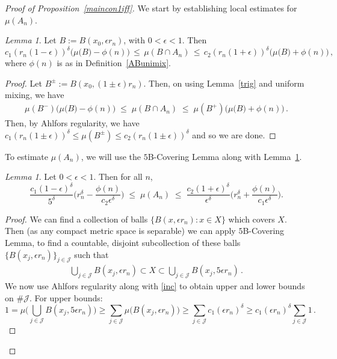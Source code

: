 \documentclass[11pt,reqno]{amsart}
\newcommand{\0}{\mathbf{0}}
\newtheorem{lemma}{Lemma}
\theoremstyle{remark}
\numberwithin{equation}{section}
\newtheorem{lemma}[theorem]{Lemma}
\theoremstyle{remark}
\numberwithin{equation}{section}
\begin{document}
\begin{proof}[Proof of Proposition~\ref{maincon1iff}]
We start by establishing local estimates for $\mu(A_n)$.
\begin{lemma}\label{lban} Let $B:=B(x_0,\epsilon r_n)$, with $0<\epsilon<1$. Then
   $$ c_1(r_n(1 - \epsilon))^\delta \big(\mu(B\big) - \phi(n)\big) \, \leq \, \mu(B \cap A_n) \, \leq \, c_2(r_n(1 + \epsilon))^\delta \big(\mu(B\big) + \phi(n)\big) \, ,
   $$
   where $\phi(n)$ is as in Definition~\ref{ABunimix}.
\end{lemma}
\begin{proof}
 Let $B^{\pm}:=B(x_0, (1\pm\epsilon)r_n)$. Then, on using Lemma~\ref{trig} and uniform mixing, we have \begin{align}
    \mu(B^-) \big(\mu(B\big) - \phi(n)\big)\; \leq \; \mu(B \cap A_n) \; \leq \;  \mu(B^+) \big(\mu(B\big) + \phi(n)\big) \, .
\end{align} Then, by Ahlfors regularity, we have $c_1(r_n(1\pm \epsilon))^\delta\leq \mu(B^\pm)\leq c_2(r_n(1\pm \epsilon))^\delta$ and so we are done.
\end{proof}
To estimate $\mu(A_n)$, we will use the $5$B-Covering Lemma along with Lemma~\ref{lban}.
\begin{lemma}\label{anbd}
Let $0<\epsilon<1$. Then for all $n$,
 $$      \frac{c_1(1-\epsilon )^\delta}{5^\delta} \big( r_n^\delta - \frac{\phi(n)}{c_2 \epsilon^\delta}\big)
   \; \leq \; \mu(A_n) \;  \leq  \; \frac{ c_2(1+\epsilon )^\delta}{ \epsilon^\delta}\big(  r_n^\delta+\frac{\phi(n)}{c_1 \epsilon^\delta} \big).
 $$
\end{lemma}
\begin{proof}
     We can find a collection of balls $\{B(x,\epsilon r_n): x\in X\} $ which covers $X$. Then (as any compact metric space is separable) we  can apply $5$B-Covering Lemma, to find a countable, disjoint subcollection of these balls 
    $
    \{B(x_j,\epsilon r_n)\}_{j \in \mathcal{J}}
    $
    such that 
    \begin{eqnarray}\label{inc}
        \bigcup_{j \in \mathcal{J}}B(x_j,\epsilon r_n) \subset X \subset \bigcup_{j \in \mathcal{J}}B(x_j,5\epsilon r_n) \, .
    \end{eqnarray}
We now use Ahlfors regularity along with \eqref{inc} to obtain upper and lower bounds on $\#\mathcal{J}$. For upper bounds:
$$
1=\mu\Big( \bigcup_{j \in \mathcal{J}}B(x_j,5\epsilon r_n)\Big) \geq \sum_{j \in \mathcal{J}} \mu\big(B(x_j, \epsilon r_n)\big) \geq 
\sum_{j \in \mathcal{J}}c_1 (\epsilon r_n)^\delta \geq c_1(\epsilon r_n)^\delta \sum_{j \in \mathcal{J}}1  \, .
$$
\end{proof}
\end{proof}
\end{document}
